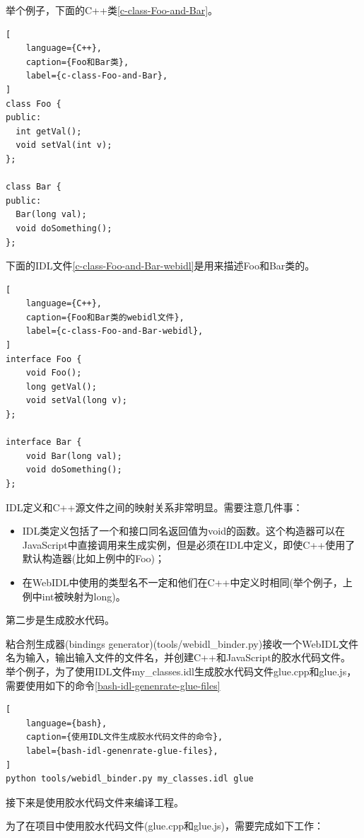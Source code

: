 举个例子，下面的C++类\ref{c-class-Foo-and-Bar}。

\begin{lstlisting}[
    language={C++},
    caption={Foo和Bar类},
    label={c-class-Foo-and-Bar},
]
class Foo {
public:
  int getVal();
  void setVal(int v);
};

class Bar {
public:
  Bar(long val);
  void doSomething();
};
\end{lstlisting}

\newpage

下面的IDL文件\ref{c-class-Foo-and-Bar-webidl}是用来描述Foo和Bar类的。

\begin{lstlisting}[
    language={C++},
    caption={Foo和Bar类的webidl文件},
    label={c-class-Foo-and-Bar-webidl},
]
interface Foo {
    void Foo();
    long getVal();
    void setVal(long v);
};

interface Bar {
    void Bar(long val);
    void doSomething();
};
\end{lstlisting}

IDL定义和C++源文件之间的映射关系非常明显。需要注意几件事：

\begin{itemize}[itemindent=2em]
    \item IDL类定义包括了一个和接口同名返回值为void的函数。这个构造器可以在JavaScript中直接调用来生成实例，但是必须在IDL中定义，即使C++使用了默认构造器(比如上例中的Foo)；
    \item 在WebIDL中使用的类型名不一定和他们在C++中定义时相同(举个例子，上例中int被映射为long)。
\end{itemize}

第二步是生成胶水代码。

粘合剂生成器(bindings generator)(tools/webidl\_binder.py)接收一个WebIDL文件名为输入，输出输入文件的文件名，并创建C++和JavaScript的胶水代码文件。
举个例子，为了使用IDL文件my\_classes.idl生成胶水代码文件glue.cpp和glue.js，需要使用如下的命令\ref{bash-idl-genenrate-glue-files}

\begin{lstlisting}[
    language={bash},
    caption={使用IDL文件生成胶水代码文件的命令},
    label={bash-idl-genenrate-glue-files},
]
python tools/webidl_binder.py my_classes.idl glue
\end{lstlisting}

接下来是使用胶水代码文件来编译工程。

为了在项目中使用胶水代码文件(glue.cpp和glue.js)，需要完成如下工作：

